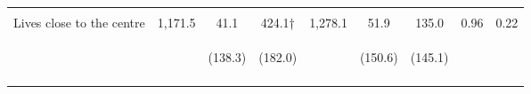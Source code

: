 \begin{table}[h!]
{\begin{tabular}{lcccccccc}
 & \begin{footnotesize}\end{footnotesize} & \begin{footnotesize}[1.000]\end{footnotesize} & \begin{footnotesize}[0.030]\end{footnotesize} & \begin{footnotesize}\end{footnotesize} & \begin{footnotesize}[1.000]\end{footnotesize} & \begin{footnotesize}[0.622]\end{footnotesize} & \begin{footnotesize}\end{footnotesize} & \begin{footnotesize}\end{footnotesize}\\
\noalign{\smallskip}Lives close to the centre & 1,171.5 & 41.1 & 424.1† & 1,278.1 & 51.9 & 135.0 & 0.96 & 0.22\\
 & \begin{footnotesize}\end{footnotesize} & \begin{footnotesize}(138.3)\end{footnotesize} & \begin{footnotesize}(182.0)\end{footnotesize} & \begin{footnotesize}\end{footnotesize} & \begin{footnotesize}(150.6)\end{footnotesize} & \begin{footnotesize}(145.1)\end{footnotesize} & \begin{footnotesize}\end{footnotesize} & \begin{footnotesize}\end{footnotesize}\\
 & \begin{footnotesize}\end{footnotesize} & \begin{footnotesize}[1.000]\end{footnotesize} & \begin{footnotesize}[0.030]\end{footnotesize} & \begin{footnotesize}\end{footnotesize} & \begin{footnotesize}[1.000]\end{footnotesize} & \begin{footnotesize}[0.622]\end{footnotesize} & \begin{footnotesize}\end{footnotesize} & \begin{footnotesize}\end{footnotesize}\\

\end{tabular}}
\end{table}

